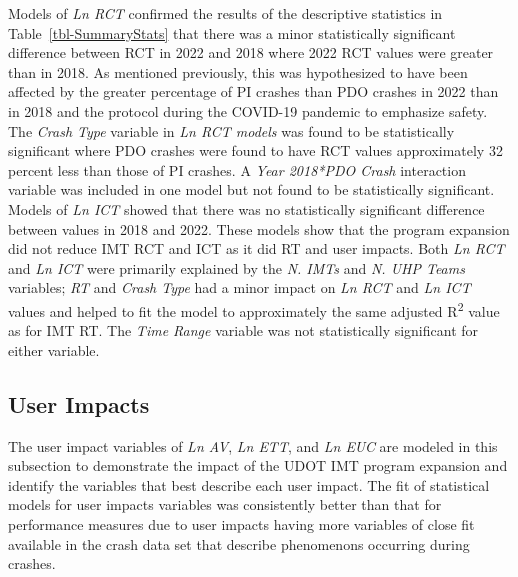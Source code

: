 \documentclass[
  letterpaper,
  authoryear]{elsarticle}
\begin{document}
Models of \emph{Ln RCT} confirmed the results of the descriptive
statistics in Table~\ref{tbl-SummaryStats} that there was a minor
statistically significant difference between RCT in 2022 and 2018 where
2022 RCT values were greater than in 2018. As mentioned previously, this
was hypothesized to have been affected by the greater percentage of PI
crashes than PDO crashes in 2022 than in 2018 and the protocol during
the COVID-19 pandemic to emphasize safety. The \emph{Crash Type}
variable in \emph{Ln RCT models} was found to be statistically
significant where PDO crashes were found to have RCT values
approximately 32 percent less than those of PI crashes. A \emph{Year
2018*PDO Crash} interaction variable was included in one model but not
found to be statistically significant. Models of \emph{Ln ICT} showed
that there was no statistically significant difference between values in
2018 and 2022. These models show that the program expansion did not
reduce IMT RCT and ICT as it did RT and user impacts. Both \emph{Ln RCT}
and \emph{Ln ICT} were primarily explained by the \emph{N. IMTs} and
\emph{N. UHP Teams} variables; \emph{RT} and \emph{Crash Type} had a
minor impact on \emph{Ln RCT} and \emph{Ln ICT} values and helped to fit
the model to approximately the same adjusted R\textsuperscript{2} value
as for IMT RT. The \emph{Time Range} variable was not statistically
significant for either variable.

\subsection{User Impacts}\label{user-impacts-1}

The user impact variables of \emph{Ln AV}, \emph{Ln ETT}, and \emph{Ln
EUC} are modeled in this subsection to demonstrate the impact of the
UDOT IMT program expansion and identify the variables that best describe
each user impact. The fit of statistical models for user impacts
variables was consistently better than that for performance measures due
to user impacts having more variables of close fit available in the
crash data set that describe phenomenons occurring during crashes.
\end{document}
